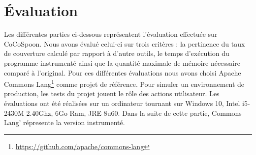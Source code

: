 \chapter{Évaluation}
	\thispagestyle{document}

Les différentes parties ci-dessous représentent l'évaluation effectuée sur CoCoSpoon. Nous avons évalué celui-ci sur trois critères : la pertinence du taux de couverture calculé par rapport à d'autre outils, le temps d'exécution du programme instrumenté ainsi que la quantité maximale de mémoire nécessaire comparé à l'original. Pour ces différentes évaluations nous avons choisi Apache Commons Lang\footnote{\url{https://github.com/apache/commons-lang}} comme projet de référence. Pour simuler un environnement de production, les tests du projet jouent le rôle des actions utilisateur. Les évaluations ont été réalisées sur un ordinateur tournant sur Windows 10, Intel i5-2430M 2.40Ghz, 6Go Ram, JRE 8u60. Dans la suite de cette partie, Commons Lang' répresente la version instrumenté.
	
		
		
		
		